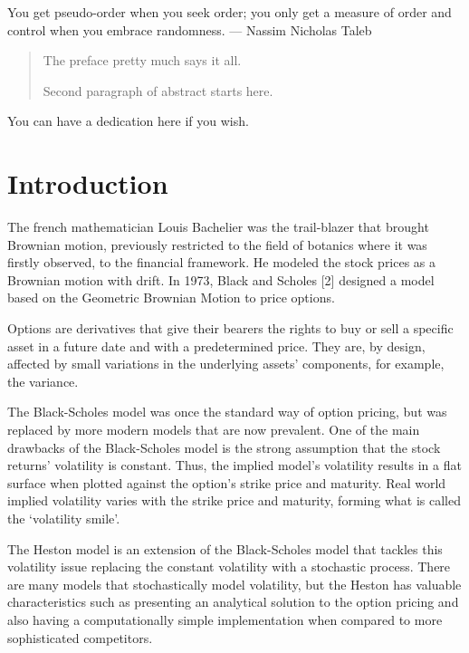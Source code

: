 \documentclass[12pt,twoside]{reedthesis}
\theoremstyle{definition}
\theoremstyle{definition}
\theoremstyle{remark}
\begin{document}
\begin{acknowledgements}
      You get pseudo-order when you seek order; you only get a measure of
      order and control when you embrace randomness. --- Nassim Nicholas Taleb
    \end{acknowledgements}
  
      \hypersetup{linkcolor=black}
    \setcounter{tocdepth}{2}
    \tableofcontents
  
      \listoftables
  
      \listoffigures
      \begin{abstract}
      The preface pretty much says it all. \par  Second paragraph of abstract
      starts here.
    \end{abstract}
      \begin{dedication}
      You can have a dedication here if you wish.
    \end{dedication}
  \mainmatter %
  \pagestyle{fancyplain} %

  \chapter{Introduction}\label{intro}
  
  The french mathematician Louis Bachelier was the trail-blazer that
  brought Brownian motion, previously restricted to the field of botanics
  where it was firstly observed, to the financial framework. He modeled
  the stock prices as a Brownian motion with drift. In 1973, Black and
  Scholes {[}2{]} designed a model based on the Geometric Brownian Motion
  to price options.
  
  Options are derivatives that give their bearers the rights to buy or
  sell a specific asset in a future date and with a predetermined price.
  They are, by design, affected by small variations in the underlying
  assets' components, for example, the variance.
  
  The Black-Scholes model was once the standard way of option pricing, but
  was replaced by more modern models that are now prevalent. One of the
  main drawbacks of the Black-Scholes model is the strong assumption that
  the stock returns' volatility is constant. Thus, the implied model's
  volatility results in a flat surface when plotted against the option's
  strike price and maturity. Real world implied volatility varies with the
  strike price and maturity, forming what is called the `volatility
  smile'.
  
  The Heston model is an extension of the Black-Scholes model that tackles
  this volatility issue replacing the constant volatility with a
  stochastic process. There are many models that stochastically model
  volatility, but the Heston has valuable characteristics such as
  presenting an analytical solution to the option pricing and also having
  a computationally simple implementation when compared to more
  sophisticated competitors.
  
\end{document}
